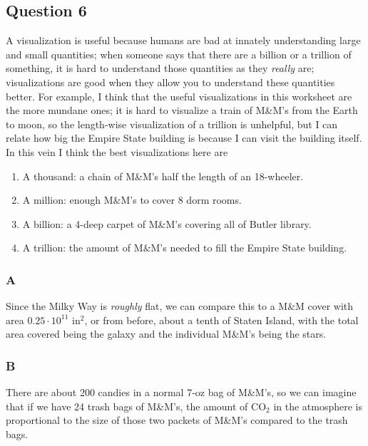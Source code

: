 \documentclass[12pt,letterpaper]{article}
\theoremstyle{definition}
\begin{document}
\subsection*{Question 6}
A visualization is useful because humans are bad at innately understanding large and small quantities; when someone says that there are a billion or a trillion of something, it is hard to understand those quantities as they \textit{really} are; visualizations are good when they allow you to understand these quantities better. For example, I think that the useful visualizations in this worksheet are the more mundane ones; it is hard to visualize a train of M\&M's from the Earth to moon, so the length-wise visualization of a trillion is unhelpful, but I can relate how big the Empire State building is because I can visit the building itself. In this vein I think the best visualizations here are
\begin{enumerate}
  \item A thousand: a chain of M\&M's half the length of an 18-wheeler.
  \item A million: enough M\&M's to cover 8 dorm rooms.
  \item A billion: a 4-deep carpet of M\&M's covering all of Butler library.
  \item A trillion: the amount of M\&M's needed to fill the Empire State building.
\end{enumerate}
\subsubsection*{A}

Since the Milky Way is \textit{roughly} flat, we can compare this to a M\&M cover with area $0.25 \cdot 10^{11}$ in$^{2}$, or from before, about a tenth of Staten Island, with the total area covered being the galaxy and the individual M\&M's being the stars.

\subsubsection*{B}

There are about 200 candies in a normal 7-oz bag of M\&M's, so we can imagine that if we have 24 trash bags of M\&M's, the amount of CO$_{2}$ in the atmosphere is proportional to the size of those two packets of M\&M's compared to the trash bags.
\end{document}
